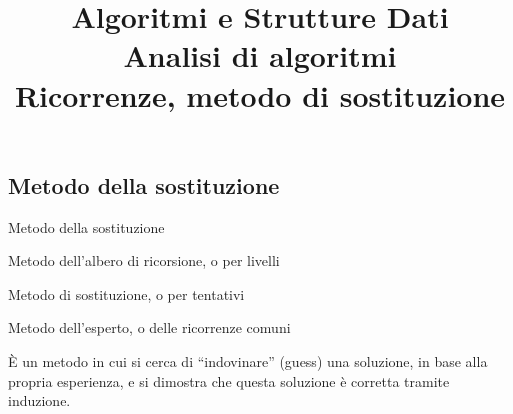 \title[ASD - Analisi di algoritmi]{\textbf{Algoritmi e Strutture Dati}\\[18pt]Analisi di algoritmi\\Ricorrenze, metodo di sostituzione}

\FrameTitle{}

\subsection{Metodo della sostituzione}


\begin{frame}{Metodo della sostituzione}

\vspace{-6pt}
\begin{myboxtitle}
\BI
\item Metodo dell'albero di ricorsione, o per livelli
\item \alert{Metodo di sostituzione, o per tentativi}
\item Metodo dell'esperto, o delle ricorrenze comuni
\EI
\end{myboxtitle}


\begin{myboxtitle}
\`E un metodo in cui si cerca di “\alert{indovinare}”  (guess) una soluzione, in base alla propria esperienza,
e si dimostra che questa soluzione è corretta tramite \alert{induzione}.
\end{myboxtitle}

\end{frame}



